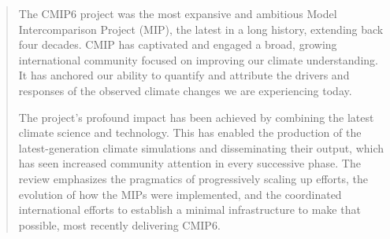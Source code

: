\documentclass[manuscript]{copernicus}
\begin{document}
\begin{abstract}

The CMIP6 project was the most expansive and ambitious Model Intercomparison Project (MIP), the latest in a long history, extending back four decades. CMIP has captivated and engaged a broad, growing international community focused on improving our climate understanding. It has anchored our ability to quantify and attribute the drivers and responses of the observed climate changes we are experiencing today.

The project's profound impact has been achieved by combining the latest climate science and technology. This has enabled the production of the latest-generation climate simulations and disseminating their output, which has seen increased community attention in every successive phase. The review emphasizes the pragmatics of progressively scaling up efforts, the evolution of how the MIPs were implemented, and the coordinated international efforts to establish a minimal infrastructure to make that possible, most recently delivering CMIP6.
\vspace{0.25cm}



\end{abstract}
\end{document}
